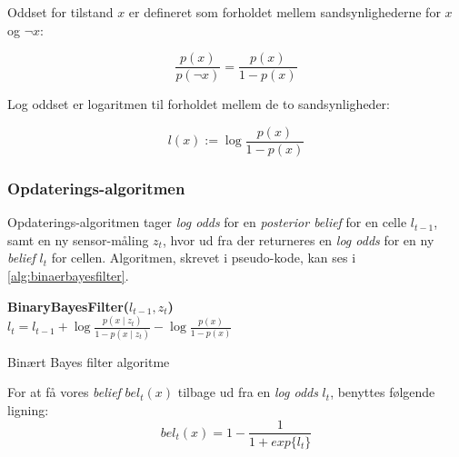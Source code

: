 Oddset for tilstand $x$ er defineret som forholdet mellem sandsynlighederne for $x$ og $\lnot x$:

\begin{equation}
\frac{p(x)}{p(\lnot x)} = \frac{p(x)}{1 - p(x)}
\end{equation}

Log oddset er logaritmen til forholdet mellem de to sandsynligheder:

\begin{equation}
l(x) := \log \frac{p(x)}{1 - p(x)}
\end{equation}

\subsubsection{Opdaterings-algoritmen}
Opdaterings-algoritmen tager \textit{log odds} for en \textit{posterior belief} for en celle $l_{t-1}$, samt en ny sensor-måling $z_t$, hvor ud fra der returneres en \textit{log odds} for en ny \textit{belief} $l_t$ for cellen.
Algoritmen, skrevet i pseudo-kode, kan ses i \cref{alg:binaerbayesfilter}.

\begin{algorithm}[h]
\textbf{BinaryBayesFilter($l_{t-1}, z_t$)} \\
\Indp $l_t = l_{t-1} + \log \frac{p(x \mid z_t)}{1-p(x \mid z_t)} - \log \frac{p(x)}{1-p(x)}$ \\
\caption{Binært Bayes filter algoritme}
\label{alg:binaerbayesfilter}
\end{algorithm}


For at få vores \textit{belief} $bel_t(x)$ tilbage ud fra en \textit{log odds} $l_t$, benyttes følgende ligning:
\begin{equation}
bel_t(x) = 1 - \frac{1}{1 + exp\{l_t\}}
\end{equation}
